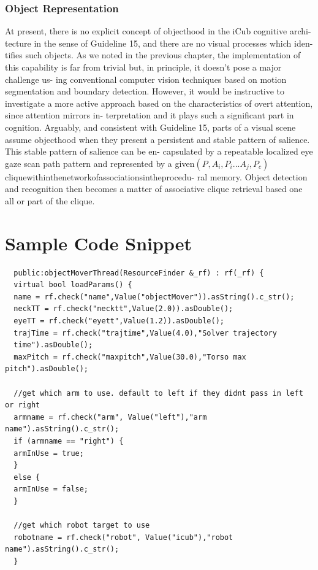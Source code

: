 \documentclass[a4paper, 11pt]{report}
\begin{document}
\subsection{Object Representation}
At present, there is no explicit concept of objecthood in the iCub cognitive 
archi- tecture in the sense of Guideline 15, and there are no visual processes 
which iden- tifies such objects. As we noted in the previous chapter, the 
implementation of this capability is far from trivial but, in principle, it 
doesn’t pose a major challenge us- ing conventional computer vision techniques 
based on motion segmentation and boundary detection. However, it would be 
instructive to investigate a more active approach based on the characteristics 
of overt attention, since attention mirrors in- terpretation and it plays such 
a significant part in cognition. Arguably, and consistent with Guideline 15, 
parts of a visual scene assume objecthood when they present a persistent and 
stable pattern of salience. This stable pattern of salience can be en- 
capsulated by a repeatable localized eye gaze scan path pattern and represented 
by a given$(P_{},A_{i},P_{i} 
...A_{j},P_{c})$cliquewithinthenetworkofassociationsintheprocedu- 
ral memory. Object detection and recognition then becomes a matter of 
associative clique retrieval based one all or part of the clique.
    
\appendix
\chapter{Sample Code Snippet}
  
  
  \begin{lstlisting}
  public:objectMoverThread(ResourceFinder &_rf) : rf(_rf) {
  virtual bool loadParams() {
  name = rf.check("name",Value("objectMover")).asString().c_str();
  neckTT = rf.check("necktt",Value(2.0)).asDouble();
  eyeTT = rf.check("eyett",Value(1.2)).asDouble();
  trajTime = rf.check("trajtime",Value(4.0),"Solver trajectory 
  time").asDouble();
  maxPitch = rf.check("maxpitch",Value(30.0),"Torso max pitch").asDouble();
  
  //get which arm to use. default to left if they didnt pass in left or right
  armname = rf.check("arm", Value("left"),"arm name").asString().c_str();
  if (armname == "right") {
  armInUse = true;
  }
  else {
  armInUse = false;
  }
  
  //get which robot target to use
  robotname = rf.check("robot", Value("icub"),"robot name").asString().c_str();
  }
\end{lstlisting}
\appendix
\end{document}
